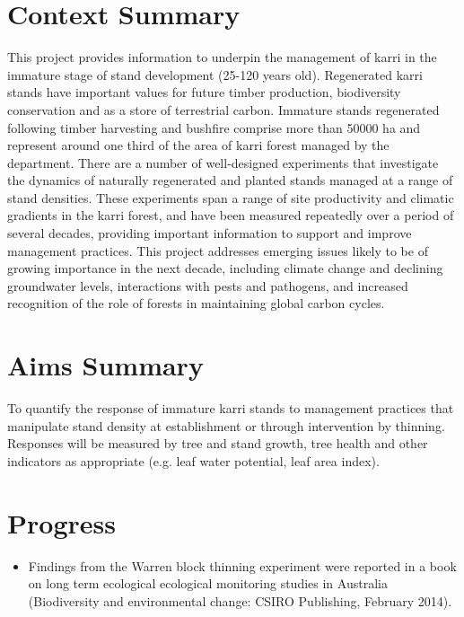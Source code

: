 \documentclass[version=last, paper=a4, DIV=18, usenames, dvipsnames]{scrartcl}
\begin{document}
\section{Context Summary}



This project provides information to underpin the management of karri in the immature stage of stand development (25-120 years old). Regenerated karri stands have important values for future timber production, biodiversity conservation and as a store of terrestrial carbon. Immature stands regenerated following timber harvesting and bushfire comprise more than 50000 ha and represent around one third of the area of karri forest managed by the department. There are a number of well-designed experiments that investigate the dynamics of naturally regenerated and planted stands managed at a range of stand densities. These experiments span a range of site productivity and climatic gradients in the karri forest, and have been measured repeatedly over a period of several decades, providing important information to support and improve management practices. This project addresses emerging issues likely to be of growing importance in the next decade, including climate change and declining groundwater levels, interactions with pests and pathogens, and increased recognition of the role of forests in maintaining global carbon cycles.






\section{Aims Summary}



To quantify the response of immature karri stands to management practices that manipulate stand density at establishment or through intervention by thinning. Responses will be measured by tree and stand growth, tree health and other indicators as appropriate (e.g. leaf water potential, leaf area index).






\section{Progress}



\begin{itemize}

  \item Findings from the Warren block thinning experiment were reported in a book on long term ecological ecological monitoring studies in Australia (Biodiversity and environmental change: CSIRO Publishing, February 2014).

\end{itemize}
\end{document}
